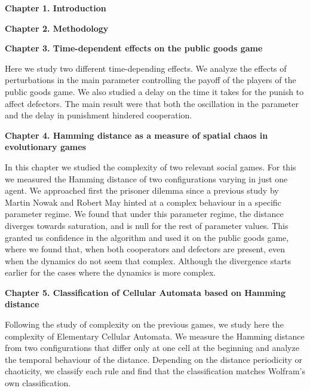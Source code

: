 

\vspace{1cm}

{\bf  Chapter 1. Introduction}

\vspace{0.6cm}

{\bf  Chapter 2. Methodology}

\vspace{0.6cm}

{\bf  Chapter 3. Time-dependent effects on the public goods game}  
\vspace{0.6cm}

Here we study two different time-depending effects. We analyze the effects of perturbations in the main parameter controlling the payoff of the players of the public goods game. We also studied a delay on the time it takes for the punish to affect defectors. The main result were that both the oscillation in the parameter and the delay in punishment hindered cooperation.
 
\vspace{0.6cm}

\vspace{0.6cm}

{\bf  Chapter 4. Hamming distance as a measure of spatial chaos in evolutionary games}  
\vspace{0.6cm}

In this chapter we studied the complexity of two relevant social games. For this we measured the Hamming distance of two configurations varying in just one agent. We approached first the prisoner dilemma since a previous study by Martin Nowak and Robert May hinted at a complex behaviour in a specific parameter regime. We found that under this parameter regime, the distance diverges towards saturation, and is null for the rest of parameter values. This granted us confidence in the algorithm and used it on the public goods game, where we found that, when both cooperators and defectors are present, even when the dynamics do not seem that complex. Although the divergence starts earlier for the cases where the dynamics is more complex.



\vspace{0.6cm}

{\bf  Chapter 5. Classification of Cellular Automata based on Hamming distance}

\vspace{0.6cm}

Following the study of complexity on the previous games, we study here the complexity of Elementary Cellular Automata. We measure the Hamming distance from two configurations that differ only at one cell at the beginning and analyze the temporal behaviour of the distance. Depending on the distance periodicity or chaoticity, we classify each rule and find that the classification matches Wolfram's own classification.

